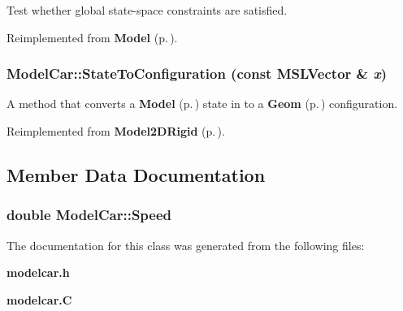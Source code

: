 Test whether global state-space constraints are satisfied.



Reimplemented from {\bf Model} {\rm (p.\,\pageref{classModel_a4})}.
\subsubsection{ Model\-Car::State\-To\-Configuration (const {\bf MSLVector} \& {\em x})\hspace{0.3cm}{\tt  [virtual]}}\label{classModelCar_a2}


A method that converts a {\bf Model} {\rm (p.\,\pageref{classModel})} state in to a {\bf Geom} {\rm (p.\,\pageref{classGeom})} configuration.



Reimplemented from {\bf Model2DRigid} {\rm (p.\,\pageref{classModel2DRigid_a7})}.

\subsection{Member Data Documentation}
\subsubsection{\setlength{\rightskip}{0pt plus 5cm}double Model\-Car::Speed}\label{classModelCar_m0}




The documentation for this class was generated from the following files:\begin{CompactItemize}
\item 
{\bf modelcar.h}\item 
{\bf modelcar.C}\end{CompactItemize}
